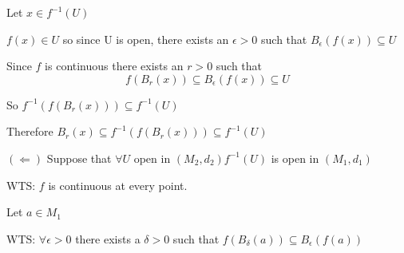 \documentclass{article}
\begin{document}
Let $x\in f^{-1} (U)$

$f(x) \in U$ so since U is open, there exists an $\epsilon >0$ such that $B_\epsilon (f(x)) \subseteq U$

Since $f$ is continuous there exists an $r>0$ such that \[f(B_r (x)) \subseteq B_\epsilon (f(x)) \subseteq U\]

So $f^{-1} (f(B_r (x))) \subseteq f^{-1} (U)$

Therefore $B_r (x) \subseteq f^{-1} (f(B_r (x))) \subseteq f^{-1} (U)$

\smallskip

$(\Leftarrow)$ Suppose that $\forall U$ open in $(M_2, d_2) f^{-1} (U)$ is open in $(M_1, d_1)$

WTS: $f$ is continuous at every point.

Let $a\in M_1$

WTS: $\forall \epsilon >0$ there exists a $\delta > 0$ such that $f(B_\delta (a)) \subseteq B_\epsilon (f(a))$
\end{document}
